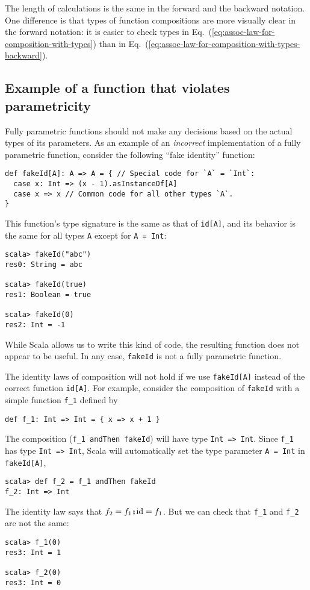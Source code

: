 The length of calculations is the same in the forward and the backward
notation. One difference is that types of function compositions are
more visually clear in the forward notation: it is easier to check
types in Eq.~(\ref{eq:assoc-law-for-composition-with-types}) than
in Eq.~(\ref{eq:assoc-law-for-composition-with-types-backward}).

\subsection{Example of a function that violates parametricity }

Fully parametric functions should not make any decisions based on
the actual types of its parameters. As an example of an \emph{incorrect}
implementation of a fully parametric function, consider the following
``fake identity'' function:
\begin{lstlisting}
def fakeId[A]: A => A = { // Special code for `A` = `Int`:
  case x: Int => (x - 1).asInstanceOf[A]
  case x => x // Common code for all other types `A`.
}
\end{lstlisting}
This function's type signature is the same as that of \lstinline!id[A]!,
and its behavior is the same for all types \lstinline!A! except for
\lstinline!A = Int!:
\begin{lstlisting}
scala> fakeId("abc")
res0: String = abc

scala> fakeId(true)
res1: Boolean = true

scala> fakeId(0)
res2: Int = -1
\end{lstlisting}
While Scala allows us to write this kind of code, the resulting function
does not appear to be useful. In any case, \lstinline!fakeId! is
not a fully parametric function.

The identity laws of composition will not hold if we use \lstinline!fakeId[A]!
instead of the correct function \lstinline!id[A]!. For example, consider
the composition of \lstinline!fakeId! with a simple function \lstinline!f_1!
defined by
\begin{lstlisting}
def f_1: Int => Int = { x => x + 1 }
\end{lstlisting}
The composition (\lstinline!f_1 andThen fakeId!) will have type \lstinline!Int => Int!.
Since \lstinline!f_1! has type \lstinline!Int => Int!, Scala will
automatically set the type parameter \lstinline!A = Int! in \lstinline!fakeId[A]!,
\begin{lstlisting}
scala> def f_2 = f_1 andThen fakeId
f_2: Int => Int
\end{lstlisting}
The identity law says that $f_{2}=f_{1}\bef\text{id}=f_{1}$. But
we can check that \lstinline!f_1! and \lstinline!f_2! are not the
same:
\begin{lstlisting}
scala> f_1(0)
res3: Int = 1

scala> f_2(0)
res3: Int = 0
\end{lstlisting}


